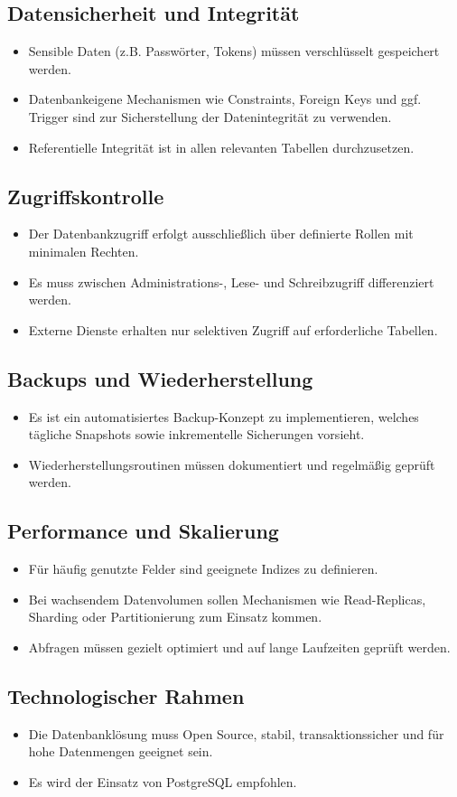 \subsection{Datensicherheit und Integrität}
\begin{itemize}
    \item Sensible Daten (z.B. Passwörter, Tokens) müssen verschlüsselt gespeichert werden.
    \item Datenbankeigene Mechanismen wie Constraints, Foreign Keys und ggf. Trigger sind zur Sicherstellung der Datenintegrität zu verwenden.
    \item Referentielle Integrität ist in allen relevanten Tabellen durchzusetzen.
\end{itemize}

\subsection{Zugriffskontrolle}
\begin{itemize}
    \item Der Datenbankzugriff erfolgt ausschließlich über definierte Rollen mit minimalen Rechten.
    \item Es muss zwischen Administrations-, Lese- und Schreibzugriff differenziert werden.
    \item Externe Dienste erhalten nur selektiven Zugriff auf erforderliche Tabellen.
\end{itemize}

\subsection{Backups und Wiederherstellung}
\begin{itemize}
    \item Es ist ein automatisiertes Backup-Konzept zu implementieren, welches tägliche Snapshots sowie inkrementelle Sicherungen vorsieht.
    \item Wiederherstellungsroutinen müssen dokumentiert und regelmäßig geprüft werden.
\end{itemize}

\subsection{Performance und Skalierung}
\begin{itemize}
    \item Für häufig genutzte Felder sind geeignete Indizes zu definieren.
    \item Bei wachsendem Datenvolumen sollen Mechanismen wie Read-Replicas, Sharding oder Partitionierung zum Einsatz kommen.
    \item Abfragen müssen gezielt optimiert und auf lange Laufzeiten geprüft werden.
\end{itemize}

\subsection{Technologischer Rahmen}
\begin{itemize}
    \item Die Datenbanklösung muss Open Source, stabil, transaktionssicher und für hohe Datenmengen geeignet sein.
    \item Es wird der Einsatz von PostgreSQL empfohlen.
\end{itemize}